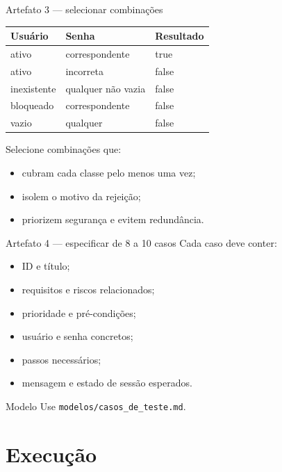 \begin{frame}{Artefato 3 — selecionar combinações}
  \small
  \begin{tabular}{p{38mm}p{39mm}p{24mm}}
    \toprule
    \textbf{Usuário} & \textbf{Senha} & \textbf{Resultado}\\
    \midrule
    ativo & correspondente & true\\
    ativo & incorreta & false\\
    inexistente & qualquer não vazia & false\\
    bloqueado & correspondente & false\\
    vazio & qualquer & false\\
    \bottomrule
  \end{tabular}
  \vspace{4mm}

  Selecione combinações que:
  \begin{itemize}
    \item cubram cada classe pelo menos uma vez;
    \item isolem o motivo da rejeição;
    \item priorizem segurança e evitem redundância.
  \end{itemize}
\end{frame}

\begin{frame}{Artefato 4 — especificar de 8 a 10 casos}
  Cada caso deve conter:
  \begin{itemize}
    \item ID e título;
    \item requisitos e riscos relacionados;
    \item prioridade e pré-condições;
    \item usuário e senha concretos;
    \item passos necessários;
    \item mensagem e estado de sessão esperados.
  \end{itemize}
  \begin{block}{Modelo}
    Use \texttt{modelos/casos\_de\_teste.md}.
  \end{block}
\end{frame}

\section{Execução}

